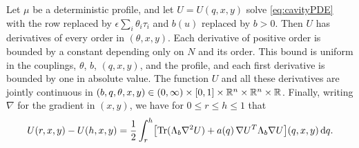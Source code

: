 \begin{lemma}\label{lem:tree-regularity}
Let $\mu$ be a deterministic profile, and let $U=U(q,x,y)$ solve
\eqref{eq:cavityPDE} with the row replaced by
$\epsilon\sum_i\theta_i\tau_i$ and $b(u)$ replaced by $b>0$. Then $U$ has
derivatives of every order in $(\theta,x,y)$. Each derivative of positive
order is bounded by a constant depending only on $N$ and its order. This
bound is uniform in the couplings, $\theta$, $b$, $(q,x,y)$, and the
profile, and each first derivative is bounded by one in absolute value.
The function $U$ and all these derivatives are jointly continuous in
$(b,q,\theta,x,y)\in(0,\infty)\times[0,1]\times\mathbb R^n\times\mathbb R^n\times\mathbb R$.
Finally, writing $\nabla$ for the gradient in $(x,y)$, we have for
$0\le r\le h\le1$ that
\begin{equation}\label{eq:tree-integrated-pde}
 U(r,x,y)-U(h,x,y)=\frac12\int_r^h\bigl[\operatorname{Tr}(\Lambda_b\nabla^2U)
   +a(q)\,\nabla U^T\Lambda_b\nabla U\bigr](q,x,y)\,\mathrm d q.
\end{equation}
\end{lemma}


